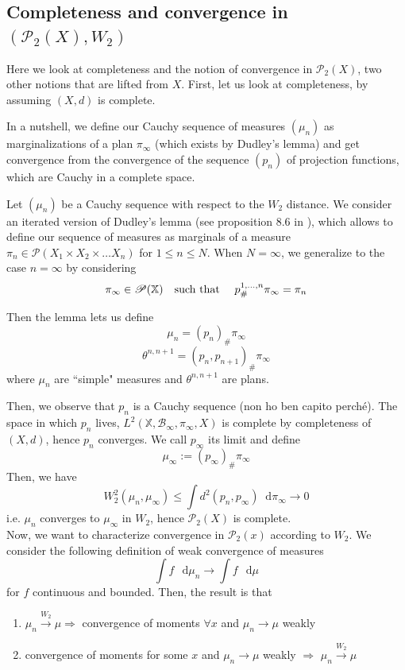 \documentclass[a4paper,12pt,reqno]{amsbook}
\theoremstyle{definition} %
\newcommand*\de{\mathop{}\!\mathrm{d}}
\newcommand{\1}{\mathbbm{1}}
\newcommand{\mP}{\mathscr{P}}
\theoremstyle{plain}
\theoremstyle{remark}
\begin{document}
\subsection{Completeness and convergence in $(\mP_2(X),W_2)$}

Here we look at completeness and the notion of convergence in $\mP_2(X)$, two other notions that are lifted from $X$. First, let us look at completeness, by assuming $(X,d)$ is complete. 

In a nutshell, we define our Cauchy sequence of measures $(\mu_n)$ as marginalizations of a plan $\pi_\infty$ (which exists by Dudley's lemma) and get convergence from the convergence of the sequence $(p_n)$ of projection functions, which are Cauchy in a complete space. 


Let $(\mu_n)$ be a Cauchy sequence with respect to the $W_2$ distance. We consider an iterated version of Dudley's lemma (see proposition 8.6 in \cite{brue}), which allows to define our sequence of measures as marginals of a measure $\pi_n \in \mP(X_1 \times X_2 \times \ldots X_n)$ for $1 \le n \le N$. When $N=\infty$, we generalize to the case $n=\infty$ by considering
\[
\pi_\infty \in \mP(\mathbb{X}) \text{\quad such that \quad} p^{1,\ldots,n}_\# \pi_\infty = \pi_n
\]

Then the lemma lets us define
\[
\mu_n = (p_n)_\# \pi_\infty \]\[ \theta^{n,n+1}=(p_n,p_{n+1})_\#\pi_\infty
\]
where $\mu_n$ are ``simple" measures and $\theta^{n, n+1}$ are plans. 

Then, we observe that $p_n$ is a Cauchy sequence (non ho ben capito perché). The space in which $p_n$ lives, $L^2(\mathbb{X}, \mathscr{B}_\infty,\pi_\infty, X)$ is complete by completeness of $(X,d)$, hence $p_n$ converges. We call $p_\infty$ its limit and define
\[
\mu_\infty := (p_\infty)_\# \pi_\infty
\]
Then, we have
\[
W_2^2(\mu_n,\mu_\infty) \le \int d^2 (p_n, p_\infty)\de {\pi_\infty} \to 0
\]
i.e. $\mu_n$ converges to $\mu_\infty$ in $W_2$, hence $\mP_2(X)$ is complete.
\\

Now, we want to characterize convergence in $\mP_2(x)$ according to $W_2$. We consider the following definition of weak convergence of measures
\[
\int f \, \de{\mu}_n \to \int f \, \de{\mu} 
\]
for $f$ continuous and bounded. Then, the result is that 
\begin{enumerate}[label=($\roman*$)]
    \item  $\mu_n \xrightarrow{W_2} \mu \Longrightarrow$ convergence of moments $\forall x$ and $\mu_n \to \mu$ weakly 
    \item  convergence of moments for some $x$ and $\mu_n \to \mu$ weakly $\Longrightarrow$ $\mu_n \xrightarrow{W_2} \mu$
\end{enumerate}
\end{document}
